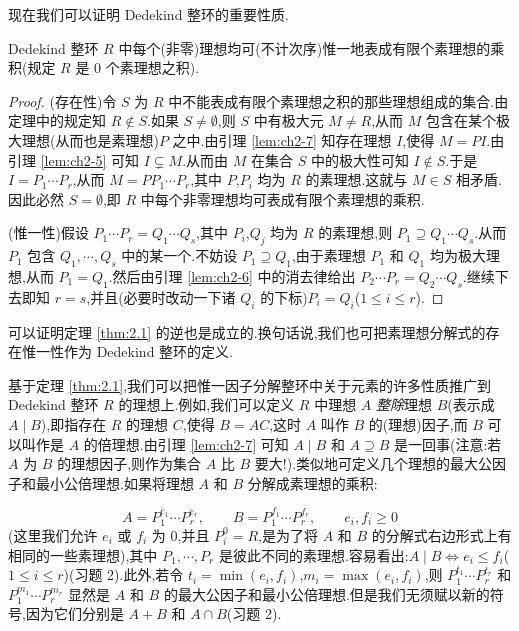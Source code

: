 现在我们可以证明 Dedekind 整环的重要性质.

\begin{theorem}\label{thm:2.1}
Dedekind 整环 $R$ 中每个(非零)理想均可(不计次序)惟一地表成有限个素理想的乘积(规定 $R$ 是 $0$ 个素理想之积).
\end{theorem}

\begin{proof}
(存在性)令 $S$ 为 $R$ 中不能表成有限个素理想之积的那些理想组成的集合.由定理中的规定知 $R\notin S$.如果 $S\neq\emptyset$,则 $S$ 中有极大元 $M\neq R$,从而 $M$ 包含在某个极大理想(从而也是素理想)$P$ 之中.由引理 \ref{lem:ch2-7} 知存在理想 $I$,使得 $M=PI$.由引理 \ref{lem:ch2-5} 可知 $I\subsetneq M$.从而由 $M$ 在集合 $S$ 中的极大性可知 $I\notin S$.于是 $I=P_1\cdots P_r$,从而 $M=PP_1\cdots P_r$,其中 $P$,$P_i$ 均为 $R$ 的素理想.这就与 $M\in S$ 相矛盾.因此必然 $S=\emptyset$,即 $R$ 中每个非零理想均可表成有限个素理想的乘积.

\begin{sloppypar}
(惟一性)假设 $P_1\cdots P_r=Q_1\cdots Q_s$,其中 $P_i$,$Q_j$ 均为 $R$ 的素理想,则 $P_1\supseteq Q_1\cdots Q_s$.从而 $P_1$ 包含 $Q_1,\cdots,Q_s$ 中的某一个.不妨设 $P_1\supseteq Q_1$,由于素理想 $P_1$ 和 $Q_1$ 均为极大理想,从而 $P_1=Q_1$.然后由引理 \ref{lem:ch2-6} 中的消去律给出 $P_2\cdots P_r=Q_2\cdots Q_s$.继续下去即知 $r=s$,并且(必要时改动一下诸 $Q_i$ 的下标)$P_i=Q_i$($1\leqslant i\leqslant r$).
\end{sloppypar}
\end{proof}

\begin{remark}
\begin{sloppypar}
可以证明定理 \ref{thm:2.1} 的逆也是成立的.换句话说,我们也可把素理想分解式的存在惟一性作为 Dedekind 整环的定义.
\end{sloppypar}
\end{remark}

\begin{sloppypar}
基于定理 \ref{thm:2.1},我们可以把惟一因子分解整环中关于元素的许多性质推广到 Dedekind 整环 $R$ 的理想上.例如,我们可以定义 $R$ 中理想 $A$ \emph{整除}理想 $B$(表示成 $A\mid B$),即指存在 $R$ 的理想 $C$,\allowbreak 使得 $B=AC$,这时 $A$ 叫作 $B$ 的(理想)因子,而 $B$ 可以叫作是 $A$ 的倍理想.由引理 \ref{lem:ch2-7} 可知 $A\mid B$ 和 $A\supseteq B$ 是一回事(注意:若 $A$ 为 $B$ 的理想因子,则作为集合 $A$ 比 $B$ 要大!).类似地可定义几个理想的最大公因子和最小公倍理想.如果将理想 $A$ 和 $B$ 分解成素理想的乘积:
\end{sloppypar}
\[
  A=P_1^{e_1}\cdots P_r^{e_r},\qquad
  B=P_1^{f_1}\cdots P_r^{f_r},\qquad e_i,f_i\geqslant 0
\]
(这里我们允许 $e_i$ 或 $f_i$ 为 $0$,并且 $P_i^0=R$,是为了将 $A$ 和 $B$ 的分解式右边形式上有相同的一些素理想),其中 $P_1,\cdots,P_r$ 是彼此不同的素理想.容易看出:$A\mid B\Leftrightarrow e_i\leqslant f_i$($1\leqslant i\leqslant r$)(习题 2).此外,若令 $t_i=\min(e_i,f_i)$,$m_i=\max(e_i,f_i)$,则 $P_1^{t_1}\cdots P_r^{t_r}$ 和 $P_1^{m_1}\cdots P_r^{m_r}$ 显然是 $A$ 和 $B$ 的最大公因子和最小公倍理想.但是我们无须赋以新的符号,因为它们分别是 $A+B$ 和 $A\cap B$(习题 2).

